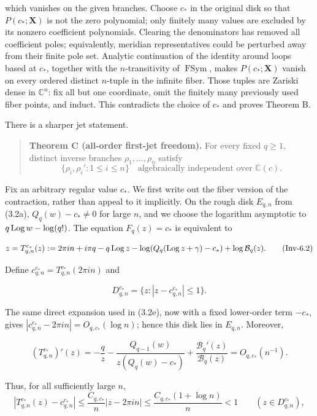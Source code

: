 which vanishes on the given branches. Choose \(c_*\) in the original disk
so that \(P(c_*;\mathbf X)\) is not the zero polynomial; only finitely many
values are excluded by its nonzero coefficient polynomials. Clearing the
denominators has removed all coefficient poles; equivalently, meridian
representatives could be perturbed away from their finite pole set. Analytic
continuation of the identity around loops based at \(c_*\), together with
the \(n\)-transitivity of \(\operatorname{FSym}\), makes
\(P(c_*;\mathbf X)\) vanish on every ordered distinct \(n\)-tuple in the
infinite fiber. Those tuples are Zariski dense in \(\mathbb C^n\): fix all
but one coordinate, omit the finitely many previously used fiber points, and
induct. This contradicts the choice of \(c_*\) and proves Theorem B.

There is a sharper jet statement.

\begin{quote}
\textbf{Theorem C (all-order first-jet freedom).} For every fixed \(q\geq1\),
distinct inverse branches \(\rho_1,\ldots,\rho_n\) satisfy
\[
 \{\rho_i,\rho_i':1\leq i\leq n\}
 \quad\text{algebraically independent over }\mathbb C(c).
\tag{Inv-6.1}
\]
\end{quote}

Fix an arbitrary regular value \(c_*\). We first write out the fiber version of the
contraction, rather than appeal to it implicitly. On the rough disk
\(E_{q,n}\) from (3.2a), \(Q_q(w)-c_*\ne0\) for large \(n\), and we choose
the logarithm asymptotic to \(q\operatorname{Log} w-\log(q!)\). The equation
\(F_q(z)=c_*\) is equivalent to

\[
 z=T^{c_*}_{q,n}(z):=2\pi in+i\pi q-q\operatorname{Log} z
 -\log(Q_q(\operatorname{Log} z+\gamma)-c_*)+\log\mathcal B_q(z).
\tag{Inv-6.2}
\]

Define \(c^{c_*}_{q,n}=T^{c_*}_{q,n}(2\pi in)\) and

\[
 D^{c_*}_{q,n}=\{z:|z-c^{c_*}_{q,n}|\leq1\}.
\]

The same direct expansion used in (3.2e), now with a fixed lower-order term
\(-c_*\), gives
\(|c^{c_*}_{q,n}-2\pi in|=O_{q,c_*}(\log n)\); hence this disk lies in
\(E_{q,n}\). Moreover,

\[
 (T^{c_*}_{q,n})'(z)
 =-\frac qz-
 \frac{Q_{q-1}(w)}{z(Q_q(w)-c_*)}
 +\frac{\mathcal B_q'(z)}{\mathcal B_q(z)}
 =O_{q,c_*}(n^{-1}).
\tag{Inv-6.3}
\]

Thus, for all sufficiently large \(n\),
\[
 |T^{c_*}_{q,n}(z)-c^{c_*}_{q,n}|
 \leq \frac{C_{q,c_*}}n|z-2\pi in|
 \leq \frac{C_{q,c_*}(1+\log n)}n<1
 \qquad(z\in D^{c_*}_{q,n}),
\]

